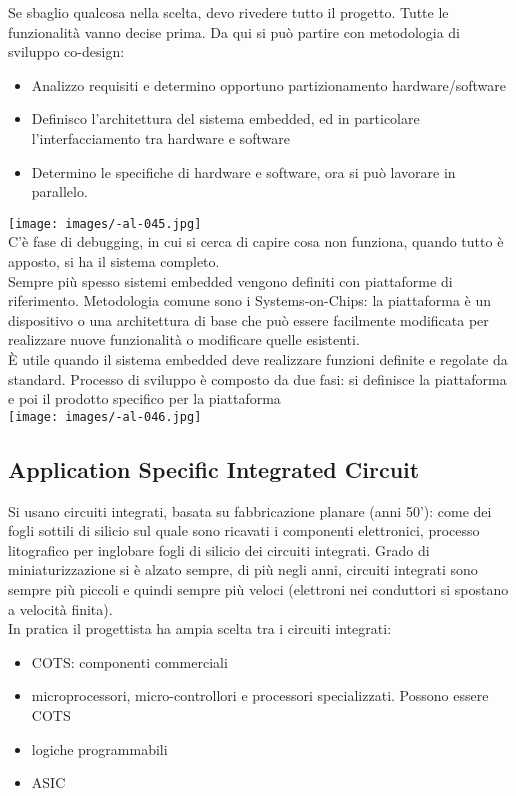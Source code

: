 \documentclass{article}
\begin{document}
Se sbaglio qualcosa nella scelta, devo rivedere tutto il progetto. Tutte le funzionalità vanno decise prima. Da qui si può partire con metodologia di sviluppo co-design:
\begin{itemize}
\item Analizzo requisiti e determino opportuno partizionamento hardware/software
\item Definisco l'architettura del sistema embedded, ed in particolare l'interfacciamento tra hardware e software
\item Determino le specifiche di hardware e software, ora si può lavorare in parallelo.
\end{itemize}
\texttt{[image: images/-al-045.jpg]}\\
C'è fase di debugging, in cui si cerca di capire cosa non funziona, quando tutto è apposto, si ha il sistema completo.\\ Sempre più spesso sistemi embedded vengono definiti con piattaforme di riferimento. Metodologia comune sono i Systems-on-Chips: la piattaforma è un dispositivo o una architettura di base che può essere facilmente modificata per realizzare nuove funzionalità o modificare quelle esistenti.\\ È utile quando il sistema embedded deve realizzare funzioni definite e regolate da standard. Processo di sviluppo è composto da due fasi: si definisce la piattaforma e poi il prodotto specifico per la piattaforma\\
\texttt{[image: images/-al-046.jpg]}
\subsection{Application Specific Integrated Circuit}
Si usano circuiti integrati, basata su fabbricazione planare (anni 50'): come dei fogli sottili di silicio sul quale sono ricavati i componenti elettronici, processo litografico per inglobare fogli di silicio dei circuiti integrati. Grado di miniaturizzazione si è alzato sempre, di più negli anni, circuiti integrati sono sempre più piccoli e quindi sempre più veloci (elettroni nei conduttori si spostano a velocità finita).\\ In pratica il progettista ha ampia scelta tra i circuiti integrati:
\begin{itemize}
\item COTS: componenti commerciali
\item microprocessori, micro-controllori e processori specializzati. Possono essere COTS
\item logiche programmabili
\item ASIC
\end{itemize}
\end{document}
